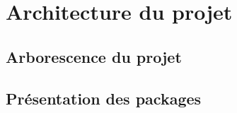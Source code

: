 \chapter{Architecture du projet}

	\section{Arborescence du projet}



	\section{Présentation des packages}
